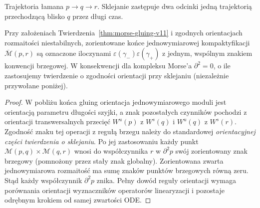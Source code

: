 \begin{center}
\par\smallskip\small Trajektoria łamana $p\to q\to r$.
Sklejanie zastępuje dwa odcinki jedną trajektorią
przechodzącą blisko $q$ przez długi czas.
\end{center}

\begin{stwierdzenie}
\label{prop:morse-d2-analytic-v11}
Przy założeniach Twierdzenia~\ref{thm:morse-gluing-v11}
i zgodnych orientacjach rozmaitości niestabilnych,
zorientowane końce jednowymiarowej kompaktyfikacji
$\overline{\mathcal M}(p,r)$ są oznaczone iloczynami
$\varepsilon(\gamma_-)\varepsilon(\gamma_+)$
z jednym, wspólnym znakiem konwencji brzegowej.
W konsekwencji dla kompleksu Morse'a $\partial^2=0$,
o ile zastosujemy twierdzenie o zgodności orientacji
przy sklejaniu (niezależnie przywołane poniżej).
\end{stwierdzenie}
\begin{proof}
W pobliżu końca gluing orientacja jednowymiarowego
moduli jest orientacją parametru długości szyjki,
a znak pozostałych czynników pochodzi z orientacji
transwersalnych przecięć $W^u(p)$ z $W^s(q)$ i
$W^u(q)$ z $W^s(r)$.
Zgodność znaku tej operacji z regułą brzegu należy do
standardowej \emph{orientacyjnej części twierdzenia
o sklejaniu}. Po jej zastosowaniu każdy punkt
\(\mathcal M(p,q)\times\mathcal M(q,r)\)
wnosi do współczynnika $r$ w $\partial^2p$ swój
zorientowany znak brzegowy (pomnożony przez stały
znak globalny). Zorientowana zwarta
jednowymiarowa rozmaitość ma sumę znaków punktów
brzegowych równą zeru. Stąd każdy współczynnik
$\partial^2p$ znika. Pełny dowód reguły orientacji
wymaga porównania orientacji wyznaczników operatorów
linearyzacji i pozostaje odrębnym krokiem od
samej zwartości ODE.
\end{proof}


